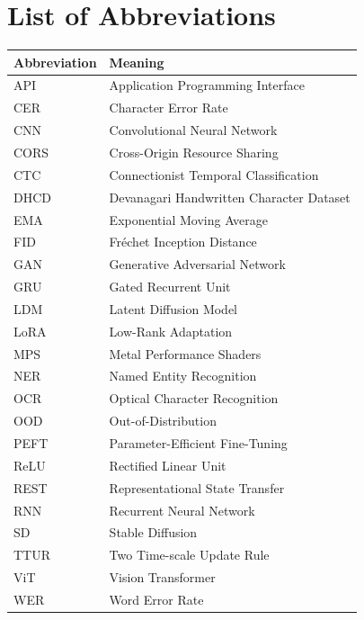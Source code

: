 \documentclass[12pt,a4paper]{report}
\begin{document}
\chapter*{List of Abbreviations}
\begin{longtable}{ll}
\toprule
\textbf{Abbreviation} & \textbf{Meaning} \\
\midrule
API & Application Programming Interface \\
CER & Character Error Rate \\
CNN & Convolutional Neural Network \\
CORS & Cross-Origin Resource Sharing \\
CTC & Connectionist Temporal Classification \\
DHCD & Devanagari Handwritten Character Dataset \\
EMA & Exponential Moving Average \\
FID & Fr\'echet Inception Distance \\
GAN & Generative Adversarial Network \\
GRU & Gated Recurrent Unit \\
LDM & Latent Diffusion Model \\
LoRA & Low-Rank Adaptation \\
MPS & Metal Performance Shaders \\
NER & Named Entity Recognition \\
OCR & Optical Character Recognition \\
OOD & Out-of-Distribution \\
PEFT & Parameter-Efficient Fine-Tuning \\
ReLU & Rectified Linear Unit \\
REST & Representational State Transfer \\
RNN & Recurrent Neural Network \\
SD & Stable Diffusion \\
TTUR & Two Time-scale Update Rule \\
ViT & Vision Transformer \\
WER & Word Error Rate \\
\bottomrule
\end{longtable}

\listoffigures
{}
\listoftables
{}

\clearpage
{}

\end{document}

